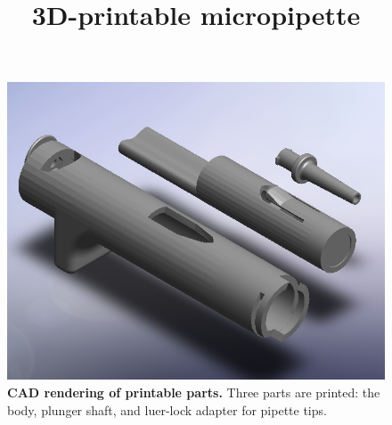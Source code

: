 \documentclass[]{article}
\title{3D-printable micropipette}
\author{}
\begin{document}
\maketitle

\begin{figure}
\includegraphics[scale=0.4]{fig1.PNG}
\caption{
{\bf CAD rendering of printable parts.}  Three parts are printed: the body, plunger shaft, and luer-lock adapter for pipette tips.
}
\label{figure1}
\end{figure}
\end{document}
